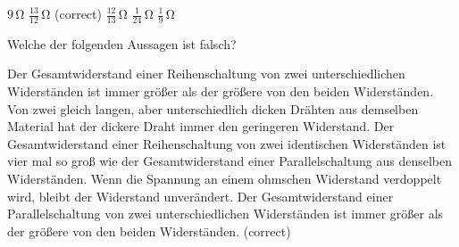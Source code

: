 \documentclass[11pt]{exam}
\begin{document}
\begin{questions}
\begin{choices}
	\choice \(\mathrm{9\,\Omega}\)
	\choice \(\mathrm{\frac{13}{12}\,\Omega}\) (correct)
	\choice \(\mathrm{\frac{12}{13}\,\Omega}\)
	\choice \(\mathrm{\frac{1}{24}\,\Omega}\)
	\choice \(\mathrm{\frac{1}{9}\,\Omega}\)
\end{choices}

\vspace{3mm}\question Welche der folgenden Aussagen ist falsch?

\begin{choices}
	\choice Der Gesamtwiderstand einer Reihenschaltung von zwei unterschiedlichen Widerständen ist immer größer als der größere von den beiden Widerständen.
	\choice Von zwei gleich langen, aber unterschiedlich dicken Drähten aus demselben Material hat der dickere Draht immer den geringeren Widerstand.
	\choice Der Gesamtwiderstand einer Reihenschaltung von zwei identischen Widerständen ist vier mal so groß wie der Gesamtwiderstand einer Parallelschaltung aus denselben Widerständen.
	\choice Wenn die Spannung an einem ohmschen Widerstand verdoppelt wird, bleibt der Widerstand unverändert.
	\choice Der Gesamtwiderstand einer Parallelschaltung von zwei unterschiedlichen Widerständen ist immer größer als der größere von den beiden Widerständen. (correct)
\end{choices}

\vspace{3mm}\end{questions}
\end{document}
